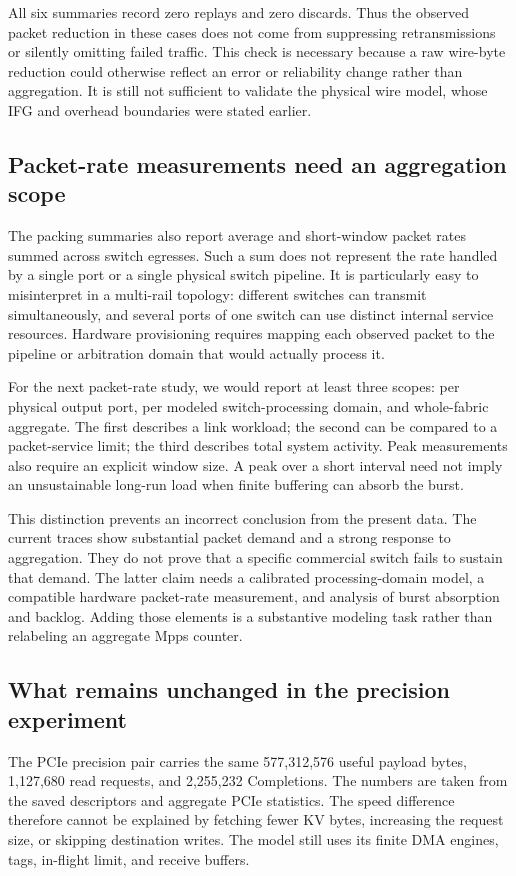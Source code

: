 All six summaries record zero replays and zero discards. Thus the observed packet reduction in these cases does not come from suppressing retransmissions or silently omitting failed traffic. This check is necessary because a raw wire-byte reduction could otherwise reflect an error or reliability change rather than aggregation. It is still not sufficient to validate the physical wire model, whose IFG and overhead boundaries were stated earlier.

\subsection{Packet-rate measurements need an aggregation scope}
The packing summaries also report average and short-window packet rates summed across switch egresses. Such a sum does not represent the rate handled by a single port or a single physical switch pipeline. It is particularly easy to misinterpret in a multi-rail topology: different switches can transmit simultaneously, and several ports of one switch can use distinct internal service resources. Hardware provisioning requires mapping each observed packet to the pipeline or arbitration domain that would actually process it.

For the next packet-rate study, we would report at least three scopes: per physical output port, per modeled switch-processing domain, and whole-fabric aggregate. The first describes a link workload; the second can be compared to a packet-service limit; the third describes total system activity. Peak measurements also require an explicit window size. A peak over a short interval need not imply an unsustainable long-run load when finite buffering can absorb the burst.

This distinction prevents an incorrect conclusion from the present data. The current traces show substantial packet demand and a strong response to aggregation. They do not prove that a specific commercial switch fails to sustain that demand. The latter claim needs a calibrated processing-domain model, a compatible hardware packet-rate measurement, and analysis of burst absorption and backlog. Adding those elements is a substantive modeling task rather than relabeling an aggregate Mpps counter.

\subsection{What remains unchanged in the precision experiment}
The PCIe precision pair carries the same 577,312,576 useful payload bytes, 1,127,680 read requests, and 2,255,232 Completions. The numbers are taken from the saved descriptors and aggregate PCIe statistics. The speed difference therefore cannot be explained by fetching fewer KV bytes, increasing the request size, or skipping destination writes. The model still uses its finite DMA engines, tags, in-flight limit, and receive buffers.

